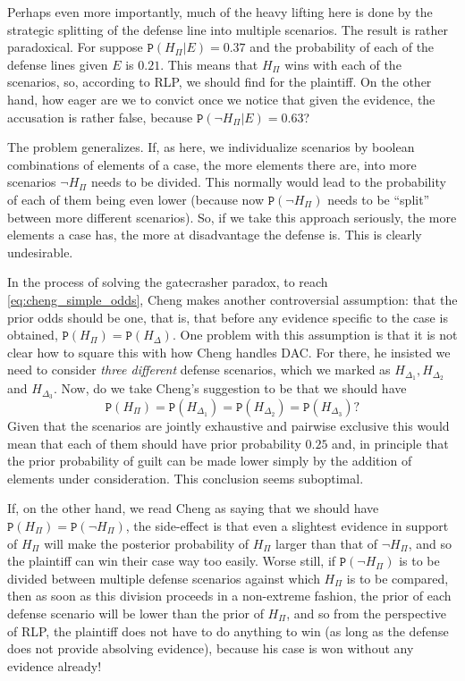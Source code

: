 \documentclass{ifcolog}
\newcommand{\pr}[1]{\mbox{$\mathtt{P}(#1)$}}
\newcommand{\n}{\neg}
\begin{document}
 Perhaps even more importantly, much of the heavy lifting here is done by the strategic splitting of the defense line into multiple scenarios. The result is rather paradoxical. For suppose $\pr{H_\Pi\vert E}=0.37$ and the probability of each of the defense lines given $E$ is $0.21$. This means that $H_\Pi$ wins with each of the scenarios, so, according to RLP, we should find for the plaintiff. On the other hand, how eager are we to convict once we notice that given the evidence, the accusation is  rather false, because $\pr{\n H_\Pi\vert E}=0.63$? 


The problem generalizes. If, as here, we individualize scenarios by boolean combinations of elements of a case, the more elements there are, into more  scenarios $\n H_\Pi$ needs to be divided. This normally would lead to the probability of each of them being even lower  (because now $\pr{\n H_\Pi}$ needs to be ``split'' between more different scenarios). So, if we take this approach seriously, the more elements a case has, the more at disadvantage the defense is. This is clearly undesirable. 


In the process of solving the gatecrasher paradox, to reach \eqref{eq:cheng_simple_odds}, Cheng makes another controversial assumption: that the prior odds should be one, that is, that before any evidence specific to the case is obtained, $\pr{H_\Pi}=\pr{H_\Delta}$. One problem with this assumption is that it is not clear how to square this with how Cheng handles DAC. For there, he insisted we need to consider \emph{three different} defense scenarios, which we marked as $H_{\Delta_1}, H_{\Delta_2}$ and $H_{\Delta_3}$. Now, do we take Cheng's suggestion to be that we should have \[\pr{H_\Pi}=\pr{H_{\Delta_1}}= \pr{H_{\Delta_2}}=\pr{H_{\Delta_3}}?\] \noindent Given that the scenarios are jointly exhaustive and pairwise exclusive this would mean that each of them should have prior probability $0.25$ and, in principle that the prior probability of guilt can be made lower simply by the addition of elements under consideration. This conclusion seems suboptimal. 



 If, on the other hand, we read Cheng as saying that we should have $\pr{H_\Pi}=\pr{\n H_\Pi}$, the side-effect is that even a slightest evidence in support of $H_\Pi$ will make the posterior probability of $H_\Pi$ larger than that of $\n H_\Pi$, and so the plaintiff can win their case way too easily. Worse still, if $\pr{\n H_\Pi}$ is to be divided between multiple defense scenarios against which $H_\Pi$ is to be compared, then as soon as this division proceeds in a non-extreme fashion, the prior of each defense scenario will be lower than the prior of $H_\Pi$, and so from the perspective of RLP, the plaintiff does not have to do anything to win (as long as the defense does not  provide absolving evidence), because his case is won without any evidence already! 
\end{document}
